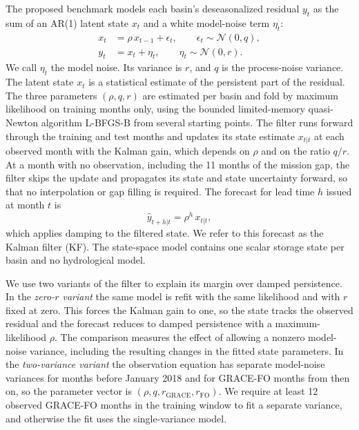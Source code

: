 \documentclass[hess, manuscript]{copernicus}
\begin{document}
The proposed benchmark models each basin's deseasonalized residual
$y_{t}$ as the sum of an AR(1) latent state $x_{t}$ and a white
model-noise term $\eta_{t}$:
\begin{align}
x_{t} &= \rho\, x_{t-1} + \epsilon_{t}, \qquad \epsilon_{t} \sim \mathcal{N}(0, q),\\
y_{t} &= x_{t} + \eta_{t}, \qquad \eta_{t} \sim \mathcal{N}(0, r).
\end{align}
We call $\eta_{t}$ the model noise. Its variance is $r$, and $q$ is the
process-noise variance. The latent state $x_{t}$ is a statistical
estimate of the persistent part of the residual.
The three parameters $(\rho, q, r)$ are estimated per basin and fold by
maximum likelihood on training months only, using the bounded
limited-memory quasi-Newton algorithm L-BFGS-B \citep{byrd1995lbfgsb}
from several starting points.
The filter runs forward through the training and test months and updates
its state estimate $x_{t|t}$ at each observed month with the Kalman gain,
which depends on $\rho$ and on the ratio $q/r$. At a month with no
observation, including the 11 months of the mission gap, the filter
skips the update and propagates its state and state uncertainty forward, so that no interpolation or gap filling is required. The forecast for lead time $h$ issued
at month $t$ is
\begin{equation}
\hat{y}_{t+h|t} = \rho^{h}\, x_{t|t},
\end{equation}
which applies damping to the filtered state. We refer to this forecast as
the Kalman filter (KF). The state-space model contains one scalar storage
state per basin and no hydrological model.

We use two variants of the filter to explain its margin over damped persistence. In the \emph{zero-$r$ variant} the same model is refit with the same likelihood and with $r$ fixed at zero. This forces
the Kalman gain to one, so the state tracks the observed residual and the
forecast reduces to damped persistence with a maximum-likelihood $\rho$.
The comparison measures the effect of allowing a nonzero model-noise
variance, including the resulting changes in the fitted state parameters.
In the \emph{two-variance variant} the observation equation has separate
model-noise variances for months before January 2018 and for GRACE-FO months
from then on, so the parameter vector is $(\rho, q, r_{\mathrm{GRACE}},
r_{\mathrm{FO}})$. We require at least 12 observed GRACE-FO months in the
training window to fit a separate variance, and otherwise the fit uses the
single-variance model.
\end{document}
